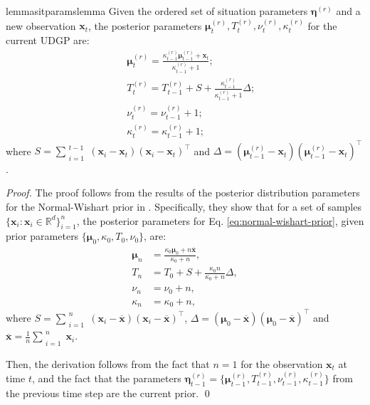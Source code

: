 \documentclass[Afour,sageh,times]{sagej}
\theoremstyle{lemma}
\begin{document}
\begin{restatable}{lemma}{sitparamslemma} \label{lemma:sit-params}
Given the ordered set of situation parameters $\boldsymbol{\eta}^{(r)}$ and a new observation $\boldsymbol{x}_t$, the posterior parameters $\boldsymbol{\mu}_t^{(r)}, T_t^{(r)}, \nu_t^{(r)}, \kappa_t^{(r)}$ for the current UDGP are:
    \begin{align} 
        &\boldsymbol{\mu}_t^{(r)} = \frac{\kappa_{t-1}^{(r)} \boldsymbol{\mu}_{t-1}^{(r)} + \boldsymbol{x}_t}{\kappa_{t-1}^{(r)} + 1}; \label{eq:post-params-mu} \\~~ &T_t^{(r)} = T_{t-1}^{(r)} + S + \frac{\kappa_{t-1}^{(r)}}{\kappa_{t-1}^{(r)} + 1} \Delta; \label{eq:post-params-T}
        \\~~ &\nu_t^{(r)} = \nu_{t-1}^{(r)} + 1; \label{eq:post-params-nu} \\~~ &\kappa_t^{(r)} = \kappa_{t-1}^{(r)} + 1;    \label{eq:post-params-kappa} 
    \end{align}
where $S = \sum_{\substack{i=1}}^{\substack{t-1}} (\boldsymbol{x}_i - \boldsymbol{x}_t)(\boldsymbol{x}_i - \boldsymbol{x}_t)^{\top}$ and $\Delta = (\boldsymbol{\mu}_{t-1}^{(r)} - \boldsymbol{x}_t)(\boldsymbol{\mu}_{t-1}^{(r)} - \boldsymbol{x}_t)^{\top}$.
\end{restatable}

\begin{proof}
    The proof follows from the results of the posterior distribution parameters for the Normal-Wishart prior in \cite[Sec. 9.10]{degroot1970optimal}. Specifically, they show that for a set of samples $\{\boldsymbol{x}_i: \boldsymbol{x}_i \in \mathbb{R}^d\}_{i = 1}^n$, the posterior parameters for Eq. \eqref{eq:normal-wishart-prior}, given prior parameters $\{\boldsymbol{\mu}_0, \kappa_0, T_0, \nu_0\}$, are:
    \begin{align*}
        \boldsymbol{\mu}_n &= \frac{\kappa_0 \boldsymbol{\mu}_0 + n \overline{\boldsymbol{x}}}{\kappa_0 + n}, \\ T_n &= T_0 + S + \frac{\kappa_0 n}{\kappa_0 + n} \Delta, \\ \nu_n &= \nu_0 + n, \\ \kappa_n &= \kappa_0 + n, 
    \end{align*}
    where $S = \sum_{\substack{i=1}}^{\substack{n}} (\boldsymbol{x}_i - \overline{\boldsymbol{x}})(\boldsymbol{x}_i - \overline{\boldsymbol{x}})^{\top}$, $\Delta = (\boldsymbol{\mu}_0 - \overline{\boldsymbol{x}})(\boldsymbol{\mu}_0 - \overline{\boldsymbol{x}})^{\top}$ and $\overline{\boldsymbol{x}} = \frac{1}{n} \sum_{\substack{i = 1}}^{\substack{n}} \boldsymbol{x}_i$.
    
    Then, the derivation follows from the fact that $n=1$ for the observation $\boldsymbol{x}_t$ at time $t$, and the fact that the parameters $\boldsymbol{\eta}_{t-1}^{(r)} = \{\boldsymbol{\mu}_{t-1}^{(r)}, T_{t-1}^{(r)}, \nu_{t-1}^{(r)}, \kappa_{t-1}^{(r)}\}$ from the previous time step are the current prior. \qed
\end{proof}
\end{document}
